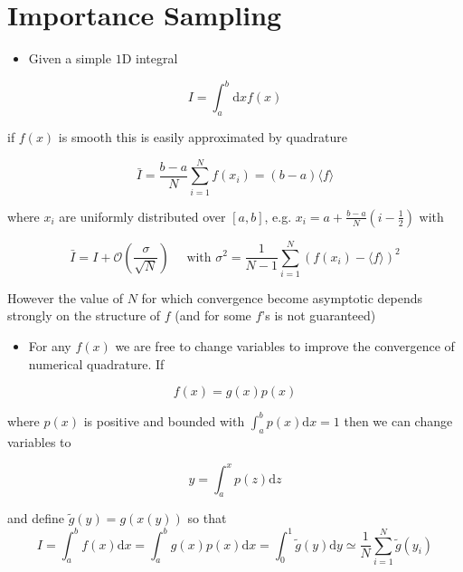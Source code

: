 \section{Importance Sampling}

\begin{itemize}
  \item Given a simple $1$D integral
\end{itemize}

\begin{equation}
I=\int_{a}^{b} \text{d} x f(x)
\end{equation}

if \(f(x)\) is smooth this is easily approximated by quadrature

\begin{equation}
\bar{I}=\frac{b-a}{N} \sum_{i=1}^{N} f\left(x_{i}\right)=(b-a)\langle f\rangle
\end{equation}

where \(x_{i}\) are uniformly distributed over \([a, b]\), e.g. \(x_{i}=a+\frac{b-a}{N}(i-\frac{1}{2})\) with

\begin{equation}
\bar{I}=I+\mathcal{O}\left(\frac{\sigma}{\sqrt{N}}\right) \quad \text { with } \sigma^{2}=\frac{1}{N-1} \sum_{i=1}^{N}\left(f\left(x_i\right)-\langle f\rangle\right)^{2}
\end{equation}

However the value of \(N\) for which convergence become asymptotic depends strongly on the structure of \(f\) (and for some $f$'s is not guaranteed)

\begin{itemize}
  \item For any \(f(x)\) we are free to change variables to improve the convergence of numerical quadrature. If
\end{itemize}

\begin{equation}
f(x)=g(x) p(x)
\end{equation}

where \(p(x)\) is positive and bounded with \(\int_{a}^{b} p(x) \text{d} x=1\) then we can change variables to

\begin{equation}
y=\int_{a}^{x} p(z) \text{d} z
\end{equation}

and define \(\tilde{g}(y)=g(x(y))\) so that
\begin{equation}
I=\int_{a}^{b} f(x) \text{d} x=\int_{a}^{b} g(x) p(x) \text{d} x=\int_{0}^{1} \tilde{g}(y)  \text{d} y \simeq \frac{1}{N} \sum_{i=1}^{N} \tilde{g}\left(y_{i}\right)
\end{equation}

